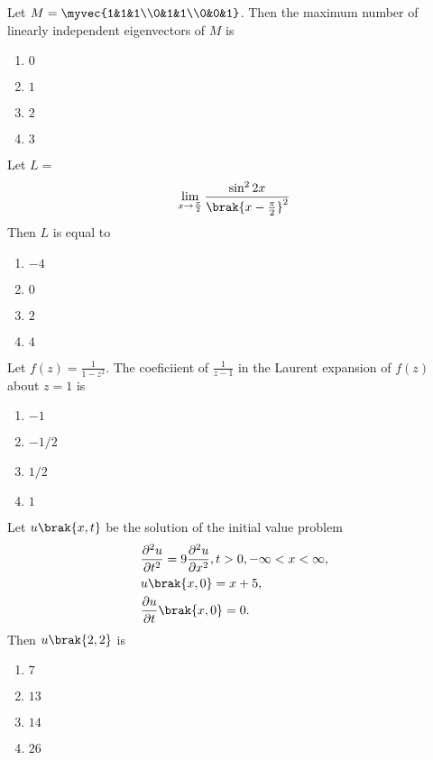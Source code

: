 \iffalse
\chapter{2007}
\author{AI24BTECH11015 - Harshvardhan Patidar}
\section{xe}
\fi
    \item Let $M = \myvec{1&1&1\\0&1&1\\0&0&1}$. Then the maximum number of linearly independent eigenvectors of $M$ is
        \begin{enumerate}
            \item $0$
            \item $1$
            \item $2$
            \item $3$
        \end{enumerate}

    \item Let $L =$ $$\lim_{x \to \frac{\pi}{2}} \frac{\sin ^ 2 2x}{\brak{x - \frac{\pi}{2}}^2}$$ Then $L$ is equal to
        \begin{enumerate}
            \item $-4$
            \item $0$
            \item $2$
            \item $4$
        \end{enumerate}

    \item Let $f(z) = \frac{1}{1-z^2}$. The coeficiient of $\frac{1}{z-1}$ in the Laurent expansion of $f(z)$ about $z=1$ is
        \begin{enumerate}
            \item $-1$
            \item $-1/2$
            \item $1/2$
            \item $1$
        \end{enumerate}

    \item Let $u\brak{x,t}$ be the solution of the initial value problem 
    \begin{align*}
        &\frac{\partial ^ 2 u}{\partial t^2} = 9 \frac{\partial ^ 2 u}{\partial x^2}, t>0, - \infty < x< \infty,\\
        &u\brak{x,0} = x+5,\\
        &\frac{\partial u}{\partial t}\brak{x,0} = 0.
    \end{align*}
    Then $u\brak{2,2}$ is 
        \begin{enumerate}
            \item $7$
            \item $13$
            \item $14$
            \item $26$
        \end{enumerate}

